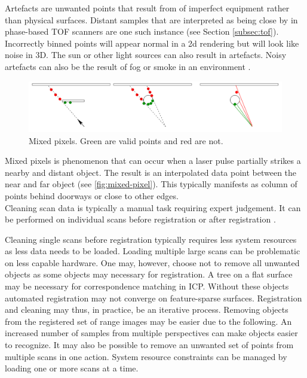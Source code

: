 Artefacts are unwanted points that result from of imperfect equipment rather than physical surfaces. Distant samples that are interpreted as being close by in phase-based TOF scanners are one such instance (see Section \ref{subsec:tof}). Incorrectly binned points will appear normal in a 2d rendering but will look like noise in 3D. The sun or other light sources can also result in artefacts. Noisy artefacts can also be the result of fog or smoke in an environment \cite{Ruther2011}.


\begin{figure}[ht]
  \centreing
  \includegraphics[width=1\linewidth]{images/mixed-pixel}
  \caption{Mixed pixels. Green are valid points and red are not. \cite{Tuley2005}}
  \label{fig:mixed-pixel}
\end{figure}

Mixed pixels is phenomenon that can occur when a laser pulse partially strikes a nearby and distant object. The result is an interpolated data point between the near and far object \cite{Tuley2005} (see \autoref{fig:mixed-pixel}). This typically manifests as column of points behind doorways or close to other edges. \\

Cleaning scan data is typically a manual task requiring expert judgement. It can be performed on individual scans before registration or after registration \cite{Ruther2011}.

Cleaning single scans before registration typically requires less system resources as less data needs to be loaded. Loading multiple large scans can be problematic on less capable hardware. One may, however, choose not to remove all unwanted objects as some objects may necessary for registration. A tree on a flat surface may be necessary for correspondence matching in ICP. Without these objects automated registration may not converge on feature-sparse surfaces. Registration and cleaning may thus, in practice, be an iterative process. Removing objects from the registered set of range images may be easier due to the following. An increased number of samples from multiple perspectives can make objects easier to recognize. It may also be possible to remove an unwanted set of points from multiple scans in one action. System resource constraints can be managed by loading one or more scans at a time.

